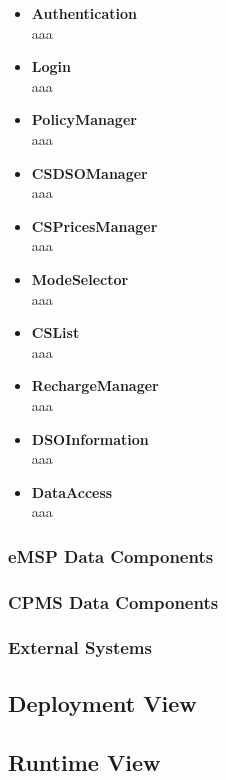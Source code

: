 \documentclass[11pt]{article}
\begin{document}
\begin{itemize}
    \item \textbf{Authentication} \\
        aaa
    \item \textbf{Login} \\
        aaa
    \item \textbf{PolicyManager} \\
        aaa
    \item \textbf{CSDSOManager} \\
        aaa
    \item \textbf{CSPricesManager} \\
        aaa
    \item \textbf{ModeSelector} \\
        aaa
    \item \textbf{CSList} \\
        aaa
    \item \textbf{RechargeManager} \\
        aaa
    \item \textbf{DSOInformation} \\
        aaa
    \item \textbf{DataAccess} \\
        aaa
\end{itemize}

\subsubsection{eMSP Data Components}


\subsubsection{CPMS Data Components}


\subsubsection{External Systems}


\subsection{Deployment View}

\subsection{Runtime View}
\end{document}
